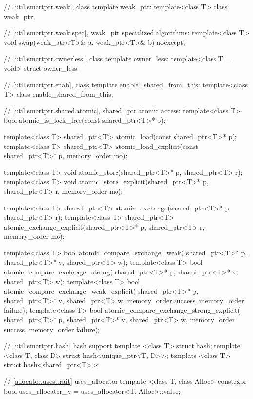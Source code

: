\begin{codeblock}
{  // \ref{util.smartptr.weak}, class template weak_ptr:
  template<class T> class weak_ptr;

  // \ref{util.smartptr.weak.spec}, weak_ptr specialized algorithms:
  template<class T> void swap(weak_ptr<T>& a, weak_ptr<T>& b) noexcept;

  // \ref{util.smartptr.ownerless}, class template owner_less:
  template<class T = void> struct owner_less;

  // \ref{util.smartptr.enab}, class template enable_shared_from_this:
  template<class T> class enable_shared_from_this;

  // \ref{util.smartptr.shared.atomic}, shared_ptr atomic access:
  template<class T>
    bool atomic_is_lock_free(const shared_ptr<T>* p);

  template<class T>
    shared_ptr<T> atomic_load(const shared_ptr<T>* p);
  template<class T>
    shared_ptr<T> atomic_load_explicit(const shared_ptr<T>* p, memory_order mo);

  template<class T>
    void atomic_store(shared_ptr<T>* p, shared_ptr<T> r);
  template<class T>
    void atomic_store_explicit(shared_ptr<T>* p, shared_ptr<T> r, memory_order mo);

  template<class T>
    shared_ptr<T> atomic_exchange(shared_ptr<T>* p, shared_ptr<T> r);
  template<class T>
    shared_ptr<T> atomic_exchange_explicit(shared_ptr<T>* p, shared_ptr<T> r,
                                           memory_order mo);

  template<class T>
    bool atomic_compare_exchange_weak(
      shared_ptr<T>* p, shared_ptr<T>* v, shared_ptr<T> w);
  template<class T>
    bool atomic_compare_exchange_strong(
      shared_ptr<T>* p, shared_ptr<T>* v, shared_ptr<T> w);
  template<class T>
    bool atomic_compare_exchange_weak_explicit(
      shared_ptr<T>* p, shared_ptr<T>* v, shared_ptr<T> w,
      memory_order success, memory_order failure);
  template<class T>
    bool atomic_compare_exchange_strong_explicit(
      shared_ptr<T>* p, shared_ptr<T>* v, shared_ptr<T> w,
      memory_order success, memory_order failure);

  // \ref{util.smartptr.hash} hash support
  template <class T> struct hash;
  template <class T, class D> struct hash<unique_ptr<T, D>>;
  template <class T> struct hash<shared_ptr<T>>;

  // \ref{allocator.uses.trait} uses_allocator
  template <class T, class Alloc> constexpr bool uses_allocator_v
    = uses_allocator<T, Alloc>::value;
}
\end{codeblock}

